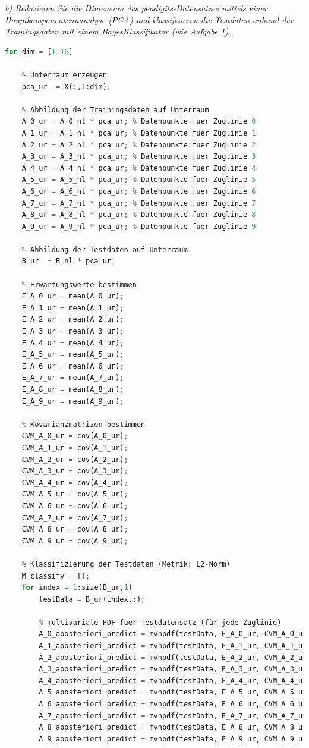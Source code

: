\documentclass[12pt]{article}
\begin{document}
\textit{b) Reduzieren Sie die Dimension des pendigits-­Datensatzes mittels einer Hauptkomponentennanalyse (PCA) und klassifizieren die Testdaten anhand der Trainingsdaten mit einem Bayes­Klassifikator (wie Aufgabe 1).}
\begin{lstlisting}[language=Python]
for dim = [1:16]

    % Unterraum erzeugen
    pca_ur  = X(:,1:dim);
    
    % Abbildung der Trainingsdaten auf Unterraum
    A_0_ur = A_0_nl * pca_ur; % Datenpunkte fuer Zuglinie 0
    A_1_ur = A_1_nl * pca_ur; % Datenpunkte fuer Zuglinie 1
    A_2_ur = A_2_nl * pca_ur; % Datenpunkte fuer Zuglinie 2
    A_3_ur = A_3_nl * pca_ur; % Datenpunkte fuer Zuglinie 3
    A_4_ur = A_4_nl * pca_ur; % Datenpunkte fuer Zuglinie 4
    A_5_ur = A_5_nl * pca_ur; % Datenpunkte fuer Zuglinie 5
    A_6_ur = A_6_nl * pca_ur; % Datenpunkte fuer Zuglinie 6
    A_7_ur = A_7_nl * pca_ur; % Datenpunkte fuer Zuglinie 7
    A_8_ur = A_8_nl * pca_ur; % Datenpunkte fuer Zuglinie 8
    A_9_ur = A_9_nl * pca_ur; % Datenpunkte fuer Zuglinie 9
    
    % Abbildung der Testdaten auf Unterraum
    B_ur  = B_nl * pca_ur;
    
    % Erwartungswerte bestimmen
    E_A_0_ur = mean(A_0_ur);
    E_A_1_ur = mean(A_1_ur);
    E_A_2_ur = mean(A_2_ur);
    E_A_3_ur = mean(A_3_ur);
    E_A_4_ur = mean(A_4_ur);
    E_A_5_ur = mean(A_5_ur);
    E_A_6_ur = mean(A_6_ur);
    E_A_7_ur = mean(A_7_ur);
    E_A_8_ur = mean(A_8_ur);
    E_A_9_ur = mean(A_9_ur);
    
    % Kovarianzmatrizen bestimmen
    CVM_A_0_ur = cov(A_0_ur);
    CVM_A_1_ur = cov(A_1_ur);
    CVM_A_2_ur = cov(A_2_ur);
    CVM_A_3_ur = cov(A_3_ur);
    CVM_A_4_ur = cov(A_4_ur);
    CVM_A_5_ur = cov(A_5_ur);
    CVM_A_6_ur = cov(A_6_ur);
    CVM_A_7_ur = cov(A_7_ur);
    CVM_A_8_ur = cov(A_8_ur);
    CVM_A_9_ur = cov(A_9_ur);
    
    % Klassifizierung der Testdaten (Metrik: L2-Norm)
    M_classify = [];
    for index = 1:size(B_ur,1)
        testData = B_ur(index,:);
    
        % multivariate PDF fuer Testdatensatz (für jede Zuglinie)
        A_0_aposteriori_predict = mvnpdf(testData, E_A_0_ur, CVM_A_0_ur) * A_x_apriori;
        A_1_aposteriori_predict = mvnpdf(testData, E_A_1_ur, CVM_A_1_ur) * A_x_apriori;
        A_2_aposteriori_predict = mvnpdf(testData, E_A_2_ur, CVM_A_2_ur) * A_x_apriori;
        A_3_aposteriori_predict = mvnpdf(testData, E_A_3_ur, CVM_A_3_ur) * A_x_apriori;
        A_4_aposteriori_predict = mvnpdf(testData, E_A_4_ur, CVM_A_4_ur) * A_x_apriori;
        A_5_aposteriori_predict = mvnpdf(testData, E_A_5_ur, CVM_A_5_ur) * A_x_apriori;
        A_6_aposteriori_predict = mvnpdf(testData, E_A_6_ur, CVM_A_6_ur) * A_x_apriori;
        A_7_aposteriori_predict = mvnpdf(testData, E_A_7_ur, CVM_A_7_ur) * A_x_apriori;
        A_8_aposteriori_predict = mvnpdf(testData, E_A_8_ur, CVM_A_8_ur) * A_x_apriori;
        A_9_aposteriori_predict = mvnpdf(testData, E_A_9_ur, CVM_A_9_ur) * A_x_apriori;
    

\end{lstlisting}
\end{document}
